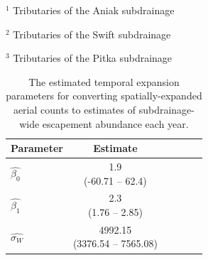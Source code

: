 \documentclass[12pt,]{book}
\theoremstyle{definition}
\theoremstyle{definition}
\theoremstyle{definition}
\theoremstyle{remark}
\begin{document}
\(^1\) Tributaries of the Aniak subdrainage

\(^2\) Tributaries of the Swift subdrainage

\(^3\) Tributaries of the Pitka subdrainage

\begin{table}[H]

\caption{\label{tab:temp-expand-table}The estimated temporal expansion parameters for converting spatially-expanded aerial counts to estimates of subdrainage-wide escapement abundance each year.}
\centering
\begin{tabular}[t]{lcclcc}
\toprule
\textbf{Parameter} & \textbf{Estimate}\\
\midrule
$\hat{\beta_0}$ & \makecell[c]{1.9\\(-60.71 -- 62.4)}\\
$\hat{\beta_1}$ & \makecell[c]{2.3\\(1.76 -- 2.85)}\\
$\hat{\sigma_W}$ & \makecell[c]{4992.15\\(3376.54 -- 7565.08)}\\
\bottomrule
\end{tabular}
\end{table}

\clearpage
\end{document}

